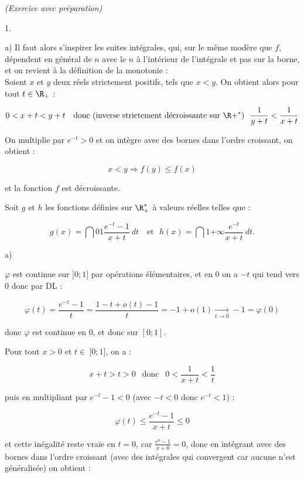 \documentclass[11pt]{article}%
\begin{document}
\begin{exercice}{\it (Exercice avec préparation)}
\begin{noliste}{1.}
\begin{noliste}{a)}
 Il faut alors s'inspirer les suites intégrales, qui, sur le même
modère que $f$, dépendent en général de $n$ avec le $n$ à l'intérieur
de l'intégrale et pas sur la borne, et on revient à la définition de la
monotonie : \\

 Soient $x$ et $y$ deux réels strictement positifs, tels que $x < y$.
On obtient alors pour tout $t \in \R_+ $ : 
 
\[
 0 < x + t < y + t \ \ \text{ donc (inverse strictement décroissante
sur } \R +^*) \ \ \frac{ 1 }{ y + t } < \frac{ 1 }{ x + t } 
\]

 On multiplie par $e^{-t} > 0$ et on intègre avec des bornes dans
l'ordre croissant, on obtient : 
 
\[
 x < y \Longrightarrow f(y) \leq f(x) 
\]

 et la fonction $f$ est décroissante.

 \end{noliste}

 \item Soit $g$ et $h$ les fonctions définies sur $\R_+^*$ à valeurs
réelles telles que : 
 
\[
 g(x) = \dint{0}{1} \frac{ e^{ -t } - 1 }{ x + t } \ dt \ \ \ \text{ et
} \ \ \ h(x) = \dint{1}{+ \infty} \frac{ e^{ -t } }{ x + t } \ dt. 
\]

 \begin{noliste}{a)}
 \setlength{\itemsep}{2mm}

 \item $\varphi$ est continue sur $] 0 ; 1]$ par opérations
élémentaires, et en 0 on a $-t$ qui tend vers 0 donc par DL : 
 
\[
 \varphi (t) = \frac{ e^{ -t } - 1 }{ t } = \frac{ 1 - t + o(t) - 1 }{
t } = -1 + o(1) \xrightarrow[ t \rightarrow 0]{} -1 = \varphi (0) 
\]

 donc $\varphi$ est continue en 0, et donc sur $[0 ; 1]$. \\

 \item Pour tout $x > 0$ et $t \in \ ] 0 ; 1]$, on a : 
 
\[
 x + t > t > 0 \ \ \text{ donc } \ \ 0 < \frac{1}{ x + t } < \frac{ 1
}{ t } 
\]

 puis en multipliant par $e^{ - t } - 1 < 0 $ (avec $-t < 0$ donc $e^{
- t } < 1 $) : 
 
\[
 \varphi (t) \leq \frac{ e^{ - t } - 1 }{ x + t } \leq 0 
\]

 et cette inégalité reste vraie en $t = 0$, car $\frac{ e^{0} - 1 }{ x
+ 0 } = 0$, donc en intégrant avec des bornes dans l'ordre croissant
(avec des intégrales qui convergent car aucune n'est généralisée) on
obtient : 
 

\end{noliste}
\end{noliste}
\end{exercice}
\end{document}
